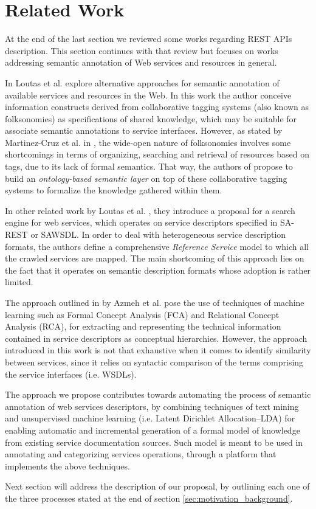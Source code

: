 \section{Related Work}
\label{sec:related_work}

\noindent At the end of the last section we reviewed some works regarding REST APIs description. This section continues with that review but focuses on works addressing semantic annotation of Web services and resources in general.

In \cite{Loutas:2010} Loutas et al. explore alternative approaches for semantic annotation of available services and resources in the Web. In this work the author conceive information constructs derived from collaborative tagging systems (also known as folksonomies) as specifications of shared knowledge, which may be suitable for associate semantic annotations to service interfaces. However, as stated by Martinez-Cruz et al. in \cite{MartinezCruz:2010}, the wide-open nature of folksonomies involves some shortcomings in terms of organizing, searching and retrieval of resources based on tags, due to its lack of formal semantics. That way, the authors of \cite{MartinezCruz:2010} propose to build an \textit{ontology-based semantic layer} on top of these collaborative tagging systems to formalize the knowledge gathered within them. 

In other related work by Loutas et al. \cite{Loutas:2012}, they introduce a proposal for a search engine for web services, which operates on service descriptors specified in SA-REST or SAWSDL. In order to deal with heterogeneous service description formats, the authors define a comprehensive \textit{Reference Service} model to which all the crawled services are mapped. The main shortcoming of this approach lies on the fact that it operates on semantic description formats whose adoption is rather limited.

The approach outlined in \cite{Azmeh:2010} by Azmeh et al. pose the use of techniques of machine learning such as Formal Concept Analysis (FCA) and Relational Concept Analysis (RCA), for extracting and representing the technical information contained in service descriptors as conceptual hierarchies. However, the approach introduced in this work is not that exhaustive when it comes to identify similarity between services, since it relies on syntactic comparison of the terms comprising the service interfaces (i.e. WSDLs). 

The approach we propose contributes towards automating the process of semantic annotation of web services descriptors, by combining techniques of text mining and unsupervised machine learning (i.e. Latent Dirichlet Allocation–LDA) for enabling  automatic and incremental generation of a formal model of knowledge from existing service documentation sources. Such model is meant to be used in annotating and categorizing services operations, through a platform that implements the above techniques. 

Next section will address the description of our proposal, by outlining each one of the three processes stated at the end of section \ref{sec:motivation_background}.
